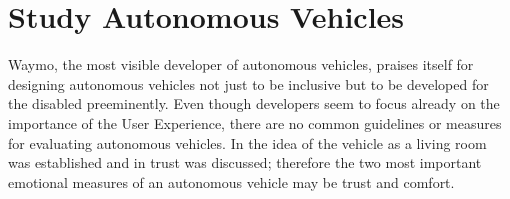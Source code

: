 \section{Study Autonomous Vehicles}\label{sec:studies}
Waymo, the most visible developer of autonomous vehicles, praises itself for designing autonomous vehicles not just to be inclusive but to be developed for the disabled preeminently\cite{Waymo2018DriverlessApplication}. Even though developers seem to focus already on the importance of the User Experience, there are no common guidelines or measures for evaluating autonomous vehicles. In  the idea of the vehicle as a living room was established and in  trust was discussed; therefore the two most important emotional measures of an autonomous vehicle may be trust and comfort.  

